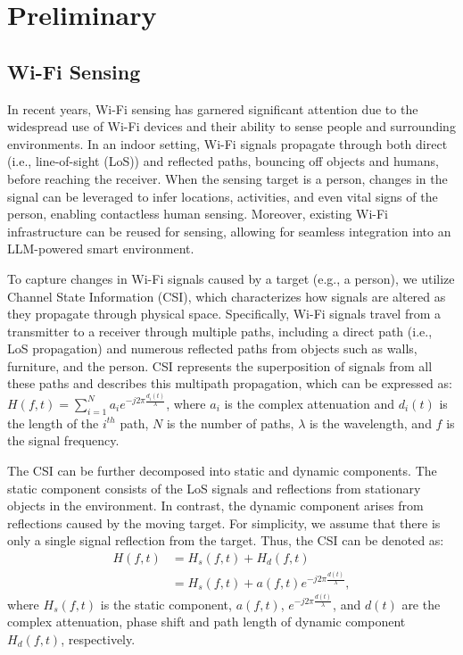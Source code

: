 
\section{Preliminary}

\subsection{Wi-Fi Sensing} \label{Preliminary}

In recent years, Wi-Fi sensing has garnered significant attention due to the widespread use of Wi-Fi devices and their ability to sense people and surrounding environments. In an indoor setting, Wi-Fi signals propagate through both direct (i.e., line-of-sight (LoS)) and reflected paths, bouncing off objects and humans, before reaching the receiver. When the sensing target is a person, changes in the signal can be leveraged to infer locations, activities, and even vital signs of the person, enabling contactless human sensing. Moreover, existing Wi-Fi infrastructure can be reused for sensing, allowing for seamless integration into an LLM-powered smart environment.

To capture changes in Wi-Fi signals caused by a target (e.g., a person), we utilize Channel State Information (CSI), which characterizes how signals are altered as they propagate through physical space. Specifically, Wi-Fi signals travel from a transmitter to a receiver through multiple paths, including a direct path (i.e., LoS propagation) and numerous reflected paths from objects such as walls, furniture, and the person. CSI represents the superposition of signals from all these paths and describes this multipath propagation, which can be expressed as: $H(f, t) = \sum^{N}_{i=1}a_{i}e^{-j2\pi \frac{d_{i}(t)}{\lambda}}$,
where $a_{i}$ is the complex attenuation and $d_{i}(t)$ is the length of the $i^{th}$ path, $N$ is the number of paths, $\lambda$ is the wavelength, and $f$ is the signal frequency.



The CSI can be further decomposed into static and dynamic components. The static component consists of the LoS signals and reflections from stationary objects in the environment. In contrast, the dynamic component arises from reflections caused by the moving target. For simplicity, we assume that there is only a single signal reflection from the target. Thus, the CSI can be denoted as: 
\vspace{-2mm}
\begin{equation} \label{eq2}
\begin{split}
H(f, t) &= H_{s}(f, t) + H_{d}(f, t) \\
&= H_{s}(f, t) + a(f,t)e^{-j2\pi \frac{d(t)}{\lambda}},
\end{split}
\end{equation}
where $H_{s}(f, t)$ is the static component, $a(f,t)$, $e^{-j2\pi \frac{d(t)}{\lambda}}$, and $d(t)$ are the complex attenuation, phase shift and path length of dynamic component $H_{d}(f, t)$, respectively.


